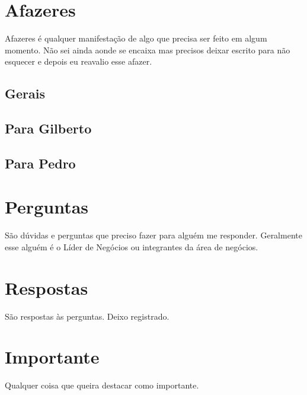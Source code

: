 \section{Afazeres}

Afazeres é qualquer manifestação de algo que precisa ser feito em algum momento. Não sei ainda aonde se encaixa mas precisos deixar escrito para não esquecer e depois eu reavalio esse afazer.

\subsection{Gerais}

\listarAmbiente[TargetTodo]{\ListaTodo}

\subsection{Para Gilberto}

\listarAmbiente[TargetTogil]{\ListaTogil}

\subsection{Para Pedro}

\listarAmbiente[TargetTopedro]{\ListaTopedro}

\section{Perguntas}

São dúvidas e perguntas que preciso fazer para alguém me responder. Geralmente esse alguém é o Líder de Negócios ou integrantes da área de negócios.

\listarAmbiente[TargetPergunta]{\ListaPergunta}

\section{Respostas}

São respostas às perguntas. Deixo registrado.

\listarAmbiente[TargetResposta]{\ListaResposta}

\section{Importante}

Qualquer coisa que queira destacar como importante.

\listarAmbiente[TargetImportante]{\ListaImportante}

